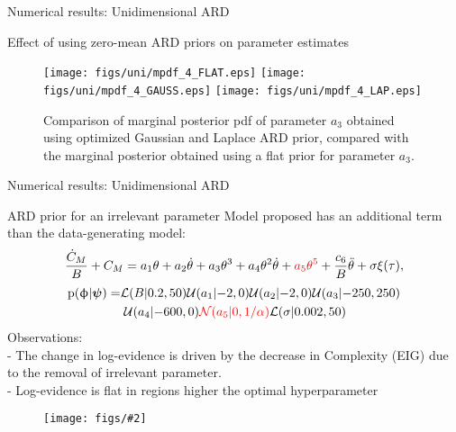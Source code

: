\documentclass[xcolor=dvipsnames,10pt]{beamer}
\newcommand{\df}{\displaystyle\frac}
\newcommand{\U}{\mathcal{U}}
\def\bpsi{\mbox{\boldmath $\psi$}}
\newcommand{\cL}{\mathcal{L}}
\newcommand{\N}{\mathcal{N}}
\def\th{\ensuremath{\theta}}
\def\dth{\ensuremath{\dot{\theta}}}
\def\ddth{\ensuremath{\ddot{\theta}}}
\def\prob{\mbox{$\text{p}$}}
\def\bphi{\mbox{\ensuremath{\upphi}}}
\newlength{\figwidthb}
\newcommand{\beq}{\begin{equation}}
\newcommand{\eeq}{\end{equation}}
\newcommand{\seq}[1]{\begin{equation} \begin{split} #1 \end{split} \end{equation}}
\def\Cm{\ensuremath{\text{C}_{m}(\th)}}
\def\dCm{\mbox{$\dot{C}_{M}$}}
\def\Cm{\ensuremath{C_{M}}}
\newcommand{\newfigure}[2]{\begin{figure}\centering 
\texttt{[image: figs/\#2]}\end{figure}\vspace{-0.2in}}
\newcommand{\red}[1]{{\textcolor{red}{#1}}}
\newcommand{\newblockb}[2]{\begin{block}{#1} \small #2 \end{block}}
\begin{document}
\begin{frame}{Numerical results: Unidimensional ARD}
\begin{center}
Effect of using zero-mean ARD priors on parameter estimates
\end{center}
\begin{figure}[!htbp]
\centering
\texttt{[image: figs/uni/mpdf\_4\_FLAT.eps]}
\texttt{[image: figs/uni/mpdf\_4\_GAUSS.eps]} 
\texttt{[image: figs/uni/mpdf\_4\_LAP.eps]}\\
\caption{Comparison of marginal posterior pdf of parameter $a_3$ obtained using optimized Gaussian and Laplace ARD prior, compared with the marginal posterior obtained using a flat prior for parameter $a_3$. }
\label{fig:md3}
\end{figure}
\end{frame}

\begin{frame}{Numerical results: Unidimensional ARD}
\newblockb{ARD prior for an irrelevant parameter}{Model proposed has an additional term than the data-generating model: \\
\beq \label{eq:aODE}
\df{\dCm}{B} + \Cm = a_1 \th + a_2 \dth + a_3 \th^3 + a_4 \th^2 \dth + \red{a_5\th^5} + \df{c_6}{B} \ddth  + \sigma \xi(\tau) ,
\eeq 
\seq{
\prob(\bphi|\bpsi) = & \cL(B|0.2, 50) \U(a_1| {-2},0)\U(a_2| {-2},0) \U(a_3|{-250},250)   \\
&\; \U(a_4|{-600},0) \red{\N(a_5|0,1/\alpha)} \cL(\sigma |0.002,50)
}
Observations: \\
- The change in log-evidence is driven by the decrease in Complexity (EIG) due to the removal of irrelevant parameter. \\
- Log-evidence is flat in regions higher the optimal hyperparameter}
\newfigure{0.8}{uni/fig_02.eps}
\end{frame}


%
\end{document}
